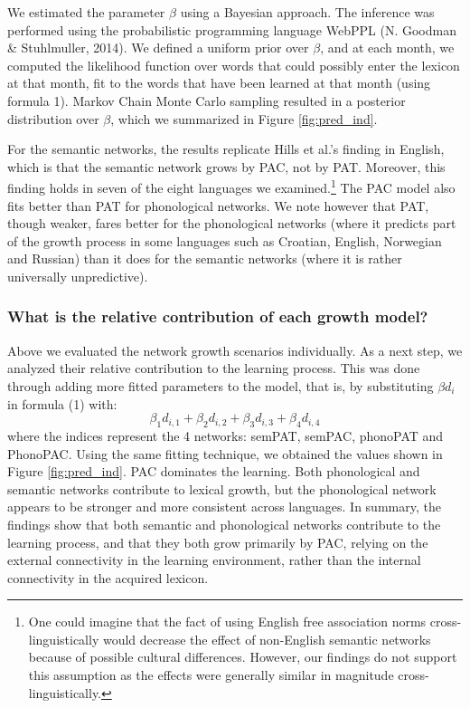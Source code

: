 \documentclass[10pt, letterpaper]{article}
\begin{document}
We estimated the parameter \(\beta\) using a Bayesian approach. The
inference was performed using the probabilistic programming language
WebPPL (N. Goodman \& Stuhlmuller, 2014). We defined a uniform prior
over \(\beta\), and at each month, we computed the likelihood function
over words that could possibly enter the lexicon at that month, fit to
the words that have been learned at that month (using formula 1). Markov
Chain Monte Carlo sampling resulted in a posterior distribution over
\(\beta\), which we summarized in Figure \ref{fig:pred_ind}.

For the semantic networks, the results replicate Hills et al.'s finding
in English, which is that the semantic network grows by PAC, not by PAT.
Moreover, this finding holds in seven of the eight languages we
examined.\footnote{One could imagine that the fact of using English free association norms cross-linguistically would decrease the effect of non-English semantic networks because of possible cultural differences. However, our findings do not support this assumption as the effects were generally similar in magnitude cross-linguistically.}
The PAC model also fits better than PAT for phonological networks. We
note however that PAT, though weaker, fares better for the phonological
networks (where it predicts part of the growth process in some languages
such as Croatian, English, Norwegian and Russian) than it does for the
semantic networks (where it is rather universally unpredictive).

\subsubsection{What is the relative contribution of each growth
model?}\label{what-is-the-relative-contribution-of-each-growth-model}

Above we evaluated the network growth scenarios individually. As a next
step, we analyzed their relative contribution to the learning process.
This was done through adding more fitted parameters to the model, that
is, by substituting \(\beta d_i\) in formula (1) with:
\[\beta_{1} d_{i, 1} + \beta_{2} d_{i, 2} + \beta_{3} d_{i, 3} + \beta_{4} d_{i, 4}\]
where the indices represent the 4 networks: semPAT, semPAC, phonoPAT and
PhonoPAC. Using the same fitting technique, we obtained the values shown
in Figure \ref{fig:pred_ind}. PAC dominates the learning. Both
phonological and semantic networks contribute to lexical growth, but the
phonological network appears to be stronger and more consistent across
languages. In summary, the findings show that both semantic and
phonological networks contribute to the learning process, and that they
both grow primarily by PAC, relying on the external connectivity in the
learning environment, rather than the internal connectivity in the
acquired lexicon.
\end{document}
